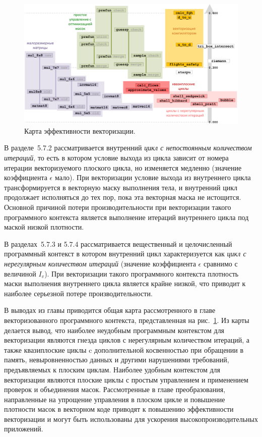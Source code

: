 \documentclass[a4paper,14pt]{extarticle}                     %
\theoremstyle{plain}                                         %
\begin{document}
\begin{figure}[!ht]
\centering
\includegraphics[width=1.0\textwidth]{./fig/vec_fin_map.pdf}
\singlespacing
\caption{Карта эффективности векторизации.}
\label{fig:vec_fin_map}
\end{figure}

В разделе~5.7.2 рассматривается внутренний \textit{цикл с непостоянным количеством итераций}, то есть в котором условие выхода из цикла зависит от номера итерации векторизуемого плоского цикла, но изменяется медленно (значение коэффициента $\epsilon$ мало).
При векторизации условие выхода из внутреннего цикла трансформируется в векторную маску выполнения тела, и внутренний цикл продолжает исполняться до тех пор, пока эта векторная маска не истощится.
Основной причиной потери производительности при векторизации такого программного контекста является выполнение итераций внутреннего цикла под маской низкой плотности.

В разделах~5.7.3 и 5.7.4 рассматривается вещественный и целочисленный программный контекст в котором внутренний цикл характеризуется как \textit{цикл с нерегулярным количеством итераций} (значение коэффициента $\epsilon$ сравнимо с величиной $I_v$).
При векторизации такого программного контекста плотность маски выполнения внутреннего цикла является крайне низкой, что приводит к наиболее серьезной потере производительности. 


В выводах из главы приводится общая карта рассмотренного в главе векторизованного программного контекста, представленная на рис.~\ref{fig:vec_fin_map}.
Из карты делается вывод, что наиболее неудобным программным контекстом для векторизации являются гнезда циклов с нерегулярным количеством итераций, а также квазиплоские циклы c дополнительной косвенностью при обращении в память, невыровненностью данных и другими нарушениями требований, предъявляемых к плоским циклам.
Наиболее удобным контекстом для векторизации являются плоские циклы с простым управлением и применением проверок и объединения масок.
Рассмотренные в главе преобразования, направленные на упрощение управления в плоском цикле и повышение плотности масок в векторном коде приводят к повышению эффективности векторизации и могут быть использованы для ускорения высокопроизводительных приложений. 
\end{document}
